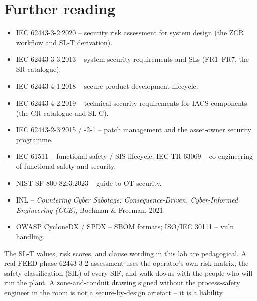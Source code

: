 \documentclass[11pt,a4paper]{article}
\begin{document}
\section*{Further reading}

\begin{notebox}
\begin{itemize}\setlength{\itemsep}{1pt}
  \item IEC 62443-3-2:2020 -- security risk assessment for system design
    (the ZCR workflow and SL-T derivation).
  \item IEC 62443-3-3:2013 -- system security requirements and SLs
    (FR1--FR7, the SR catalogue).
  \item IEC 62443-4-1:2018 -- secure product development lifecycle.
  \item IEC 62443-4-2:2019 -- technical security requirements for IACS
    components (the CR catalogue and SL-C).
  \item IEC 62443-2-3:2015 / -2-1 -- patch management and the asset-owner
    security programme.
  \item IEC 61511 -- functional safety / SIS lifecycle; IEC TR 63069 --
    co-engineering of functional safety and security.
  \item NIST SP 800-82r3:2023 -- guide to OT security.
  \item INL -- \emph{Countering Cyber Sabotage: Consequence-Driven,
    Cyber-Informed Engineering (CCE)}, Bochman \& Freeman, 2021.
  \item OWASP CycloneDX / SPDX -- SBOM formats; ISO/IEC 30111 -- vuln
    handling.
\end{itemize}
\end{notebox}

\begin{warnbox}
The SL-T values, risk scores, and clause wording in this lab are
pedagogical. A real FEED-phase 62443-3-2 assessment uses the operator's
own risk matrix, the safety classification (SIL) of every SIF, and
walk-downs with the people who will run the plant. A zone-and-conduit
drawing signed without the process-safety engineer in the room is not a
secure-by-design artefact -- it is a liability.
\end{warnbox}
\end{document}
